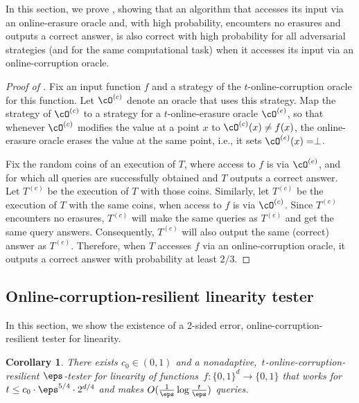 \documentclass[11pt]{article}
\numberwithin{equation}{section}
\newtheorem{corollary}[theorem]{Corollary}
\theoremstyle{definition}
\theoremstyle{plain}
\begin{document}
In this section, we prove , showing that an algorithm  that accesses its input via an online-erasure oracle and, with high probability, encounters no erasures and outputs a correct answer, is also correct with high probability for all adversarial strategies (and for the same computational task) when it accesses its input via an online-corruption oracle.

\begin{proof}[Proof of ]
 Fix an input function $f$ and a strategy of the $t$-online-corruption oracle for this function. Let $\cO^{(c)}$ denote an oracle that uses this strategy. Map the strategy of $\cO^{(c)}$ to a strategy for a $t$-online-erasure oracle $\cO^{(e)}$, so that whenever $\cO^{(c)}$ modifies the value at a point $x$ to $\cO^{(c)}(x) \neq f(x)$, the online-erasure oracle erases the value at the same point, i.e.,  it sets $\cO^{(e)}(x) = \perp$. 
 
 Fix the random coins of an execution of $T$, where access to $f$ is via $\cO^{(e)}$, and for which all queries are successfully obtained and $T$ outputs a correct answer. Let $T^{(e)}$ be the execution of $T$ with those coins. Similarly, let $T^{(c)}$ be the execution of $T$ with the same coins, when access to $f$ is via $\cO^{(c)}$. Since $T^{(e)}$ encounters no erasures, $T^{(c)}$ will make the same queries as $T^{(e)}$ and get the same query answers. Consequently, $T^{(c)}$ will also output the same (correct) answer as  $T^{(e)}$. Therefore, when $T$ accesses $f$ via an online-corruption oracle, it outputs a correct answer with probability at least $2/3$.
\end{proof}


%
\subsection{Online-corruption-resilient linearity tester}\label{sec:linearity_corrupt}

In this section, we show the existence of a 2-sided error, online-corruption-resilient tester for linearity. 


\begin{corollary}\label{cor:linearity_corruptions}
There exists 
$c_0 \in (0,1)$ and a nonadaptive,~$t$-online-corruption-resilient $\eps$-tester for linearity of functions~$f\colon \{0,1\}^d \to \{0,1\}$ that  works for $t \leq c_0\cdot\eps^{5/4} \cdot  2^{d/4}$ and makes $O(\frac{1}{\eps}\log \frac{t}{\eps})$ queries.
\end{corollary}
\end{document}
